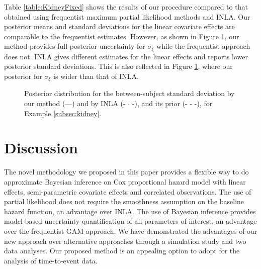 \documentclass[num-refs,serif,10pt]{wiley-article}
\begin{document}
Table \ref{table:KidneyFixed} shows the results of our procedure compared to that obtained using frequentist maximum partial likelihood methods and INLA. Our posterior means and standard deviations for the linear covariate effects are comparable to the frequentist estimates. However, as shown in Figure \ref{fig:BetweenSubjectSD}, our method provides full posterior uncertainty for $\sigma_{\xi}$ while the frequentist approach does not. INLA gives different estimates for the linear effects and reports lower posterior standard deviations. This is also reflected in Figure \ref{fig:BetweenSubjectSD}, where our posterior for $\sigma_{\xi}$ is wider than that of INLA.

\begin{figure}[ht]
\centering
{}
\caption{Posterior distribution for the between-subject standard deviation by our method (---) and by INLA (- $\cdot$ -), and its prior (- - -), for Example \ref{subsec:kidney}.}
\label{fig:BetweenSubjectSD}
\end{figure}

\section{Discussion}\label{sec:discussion}

The novel methodology we proposed in this paper provides a flexible way to do approximate Bayesian inference on Cox proportional hazard model with linear effects, semi-parametric covariate effects and correlated observations. The use of  partial likelihood does not require the smoothness assumption on the baseline hazard function, an advantage over INLA. The use of Bayesian inference provides model-based uncertainty quantification of all parameters of interest, an advantage over the frequentist GAM approach. We have demonstrated the advantages of our new approach over alternative approaches through a simulation study and two data analyses. Our proposed method is an appealing option to adopt for the analysis of time-to-event data.
\end{document}
